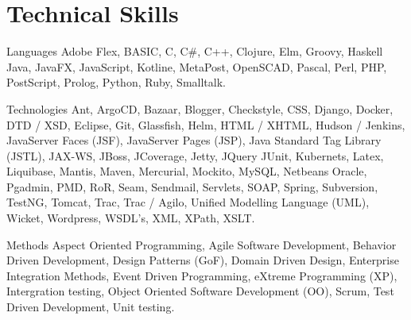 \section*{Technical Skills}

	\begin{skillList}
		\item[Languages] Adobe Flex, BASIC, C, C\#, C++, Clojure, Elm, Groovy, Haskell
		Java, JavaFX, JavaScript, Kotline, MetaPost, OpenSCAD, Pascal, Perl, PHP, PostScript, 
		Prolog, Python, Ruby, Smalltalk.\hfill\\
		
		\item[Technologies] Ant, ArgoCD, Bazaar, Blogger, Checkstyle, CSS, Django, Docker, DTD / XSD, 
		Eclipse, Git, Glassfish, Helm, HTML / XHTML, Hudson / Jenkins, 
		JavaServer Faces (JSF), JavaServer Pages (JSP), 
		Java Standard Tag Library (JSTL), JAX-WS, JBoss, JCoverage, Jetty, JQuery
		JUnit, Kubernets, Latex, Liquibase, Mantis, Maven, Mercurial, Mockito, MySQL, Netbeans
		Oracle, Pgadmin, PMD, RoR, Seam, Sendmail, Servlets, SOAP, Spring, Subversion,
		TestNG, Tomcat, Trac, Trac / Agilo, Unified Modelling Language (UML),
		Wicket, Wordpress, WSDL's, XML, XPath, XSLT.\hfill\\
		
		\item[Methods] Aspect Oriented Programming, Agile Software Development,
		Behavior Driven Development, Design Patterns (GoF), Domain Driven Design, 
		Enterprise Integration Methods, Event Driven Programming, 
		eXtreme Programming (XP), Intergration testing, Object Oriented Software Development (OO), 
		Scrum, Test Driven Development, Unit testing.\hfill\\
		
	\end{skillList}
